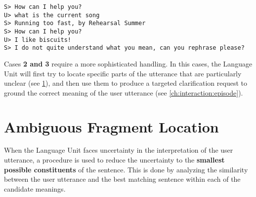 \texttt{S> How can I help you? \\
U> what is the current song \\
S> Running too fast, by Rehearsal Summer \\
S> How can I help you? \\
U> I like biscuits! \\
S> I do not quite understand what you mean, can you rephrase please?}

Cases \textbf{2 and 3} require a more sophisticated handling. In this cases, the Language Unit will first try to locate specific parts of the utterance that are particularly unclear (see \ref{ch:interaction:afl}), and then use them to produce a targeted clarification request to ground the correct meaning of the user utterance (see \ref{ch:interaction:episode}).


\section{Ambiguous Fragment Location} \label{ch:interaction:afl}
When the Language Unit faces uncertainty in the interpretation of the user utterance, a procedure is used to reduce the uncertainty to the \textbf{smallest possible constituents} of the sentence. This is done by analyzing the similarity between the user utterance and the best matching sentence within each of the candidate meanings.

